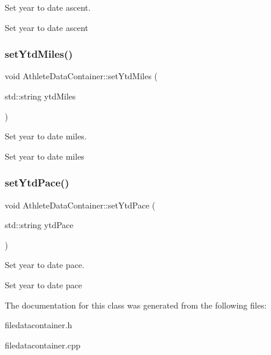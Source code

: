 Set year to date ascent. 

Set year to date ascent \mbox{\label{classAthleteDataContainer_aae9279049adc3c9e85d1f5c3add60c88}} 
\subsubsection{\texorpdfstring{setYtdMiles()}{setYtdMiles()}}
{\footnotesize\ttfamily void Athlete\+Data\+Container\+::set\+Ytd\+Miles (\begin{DoxyParamCaption}\item[{std\+::string}]{ytd\+Miles }\end{DoxyParamCaption})}



Set year to date miles. 

Set year to date miles \mbox{\label{classAthleteDataContainer_a821352a815f156be80cb82b7cd6134c2}} 
\subsubsection{\texorpdfstring{setYtdPace()}{setYtdPace()}}
{\footnotesize\ttfamily void Athlete\+Data\+Container\+::set\+Ytd\+Pace (\begin{DoxyParamCaption}\item[{std\+::string}]{ytd\+Pace }\end{DoxyParamCaption})}



Set year to date pace. 

Set year to date pace 

The documentation for this class was generated from the following files\+:\begin{DoxyCompactItemize}
\item 
filedatacontainer.\+h\item 
filedatacontainer.\+cpp\end{DoxyCompactItemize}
